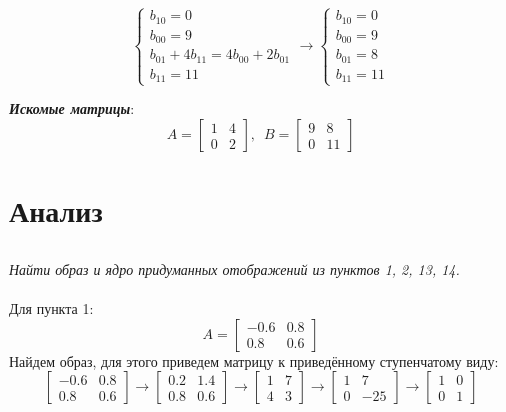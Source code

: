 \documentclass[a5paper, 10pt]{article}
\theoremstyle{definition}
\theoremstyle{plain}
\theoremstyle{remark}
\begin{document}
\begin{equation}
\begin{cases}
b_{1 0} = 0\\
b_{0 0} = 9\\
b_{0 1} + 4 b_{1 1} = 4b_{0 0} + 2b_{0 1}\\
 b_{1 1} = 11
\end{cases}
\to
\begin{cases}
b_{1 0} = 0\\
b_{0 0} = 9\\
b_{0 1} = 8\\
 b_{1 1} = 11
\end{cases}
\end{equation}


\textit{\textbf{Искомые матрицы}}:
\begin{equation}
A=
\begin{bmatrix}
1 & 4\\
0 & 2
\end{bmatrix}
, \, \, \, 
B=
\begin{bmatrix}
9 & 8\\
0 & 11
\end{bmatrix}
\end{equation}


\newpage
\section{Анализ}
\subsection{}
\textit{Найти образ и ядро придуманных отображений из пунктов 1, 2, 13, 14.}\\
\\
Для пункта 1:
\begin{equation}
A =
\begin{bmatrix}
-0.6 & 0.8\\
0.8 & 0.6
\end{bmatrix}
\end{equation}
Найдем образ, для этого приведем матрицу к приведённому ступенчатому виду:
\begin{equation}
\begin{bmatrix}
-0.6 & 0.8\\
0.8 & 0.6
\end{bmatrix}
\to
\begin{bmatrix}
0.2 & 1.4\\
0.8 & 0.6
\end{bmatrix}
\to
\begin{bmatrix}
1 & 7\\
4 & 3
\end{bmatrix}
\to
\begin{bmatrix}
1 & 7\\
0 & -25
\end{bmatrix}
\to
\begin{bmatrix}
1 & 0\\
0 & 1
\end{bmatrix}
\end{equation}
\end{document}
